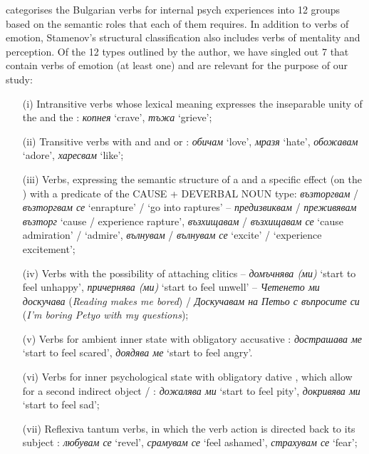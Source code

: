 \documentclass[output=paper,colorlinks,citecolor=brown]{langscibook}
\begin{document}
\citet [70]{Stamenov2021} categorises the Bulgarian verbs for internal psych experiences into 12 groups based on the semantic roles that each of them requires. In addition to verbs of emotion, Stamenov's structural classification also includes verbs of mentality and perception. Of the 12 types outlined by the author, we have singled out 7 that contain verbs of emotion (at least one) and are relevant for the purpose of our study:

\begin{itemize}
\item[(i)] Intransitive verbs whose lexical meaning expresses the inseparable unity of the  and the : \textit{копнея} `crave', \textit{тъжа} `grieve';

\item[(ii)] Transitive verbs with and  and  or : \textit{оби\-чам} `love', \textit{мразя} `hate', \textit{обожавам} `adore', \textit{харесвам} `like';

\item[(iii)] Verbs, expressing the semantic structure of a  and a specific effect (on the ) with a predicate of the CAUSE + DEVERBAL NOUN type: \textit{възторгвам} / \textit{възторгвам се} `enrapture' / `go into raptures' –\textit{ предизвиквам} / \textit{преживявам възторг} `cause / experience rapture', \textit{възхи\-щавам} / \textit{възхищавам се} `cause admiration' / `admire', \textit{вълнувам} / \textit{вълну\-вам се} `excite' / `experience excitement';

\item[(iv)] Verbs with the possibility of attaching clitics – \textit{домъчнява (ми)} `start to feel unhappy', \textit{причернява (ми)} `start to feel unwell' – \textit{Четенето ми доскуча\-ва} (\textit{Reading makes me bored}) / \textit{Доскучавам на Петьо с въпросите си} (\textit{I'm boring Petyo with my questions});

\item[(v)] Verbs for ambient inner state with obligatory accusative : \textit{дострашава ме} `start to feel scared', \textit{доядява ме} `start to feel angry'.

\item[(vi)] Verbs for inner psychological state with obligatory dative , which allow for a second indirect object  / : \textit{дожалява ми} `start to feel pity', \textit{докривява ми} `start to feel sad';

\item[(vii)] Reflexiva tantum verbs, in which the verb action is directed back to its subject : \textit{любувам се} `revel', \textit{срамувам се} `feel ashamed', \textit{страху\-вам се} `fear';
\end{itemize}
\end{document}
